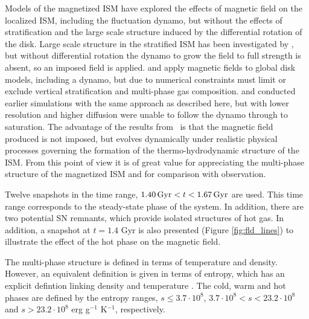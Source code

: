\documentclass[useAMS,usenatbib]{mn2e}
\begin{document}
Models of the magnetized ISM \citep{Heitsch01,M-LBKA05} 
have explored the 
effects of magnetic field on the localized ISM, including the fluctuation 
dynamo, but without the effects of stratification and the large scale 
structure induced by the differential rotation of the disk.
Large scale structure in the stratified ISM has been investigated by
\citet{AB05a}, but without differential rotation the dynamo to grow the field
to full strength is absent, so an imposed field is applied. 
\citet{Hanasz05,Dobbs08} and \citet{Hanasz09} apply magnetic fields to global 
disk models, including a dynamo, but due to numerical constraints must limit or 
exclude vertical stratification and multi-phase gas composition.
\citet{Korpi99a} and \cite{Gressel08} conducted earlier simulations with the
same approach as described here, but with lower resolution and higher 
diffusion were unable to follow the dynamo through to saturation.
The advantage of the results from \MHD\ is that the magnetic field produced
is not imposed, but evolves dynamically under realistic physical processes
governing the formation of the thermo-hydrodynamic structure of the ISM.
From this point of view it is of great value for appreciating the 
multi-phase structure of the magnetized ISM and for comparison with observation.

Twelve snapshots in the time range, $1.40\,{\rm Gyr}<t<1.67\,{\rm Gyr}$ are used. 
This time range corresponds to the steady-state phase of the system. 
In addition, there are two potential SN remnants, which provide isolated 
structures of hot gas. 
In addition, a snapshot at $t=1.4$ Gyr is also presented 
(Figure \ref{fig:fld_lines}) to illustrate the effect of the hot phase on 
the magnetic field. 

The multi-phase structure is defined in terms of temperature and density. However, an equivalent definition is given in terms of entropy, which has an explicit defintion linking density and temperature \citep{Gent12}. The cold, warm and hot phases are defined by the entropy ranges, $s\leq3.7\cdot10^8$, $3.7\cdot10^8<s<23.2\cdot10^8$ and $s>23.2\cdot10^8$ erg g$^{-1}$ K$^{-1}$, respectively. 
\end{document}
